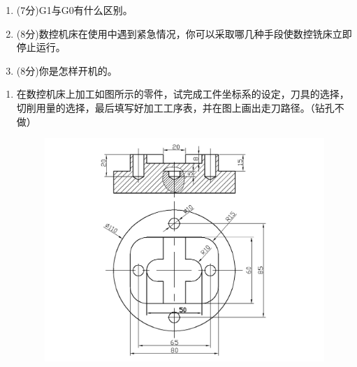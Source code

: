 \documentclass[12pt,twocolumn,landscape,UTF8,twoside]{ctexart}
\begin{document}
\begin{spacing}{1}
\begin{enumerate} [1.]
{	取中法对刀就是使用对刀或对刀工具接触工件上关于坐标轴对称的点，取得对称点的机床坐标，通过中点计算公式，计算出工件坐标系原点在机床坐标系中的坐标。 
	
	取中法对刀就是使用对刀或对刀工具接触工件上关于坐标轴对称的点，取得对称点的机床坐标，通过中点计算公式，计算出工件坐标系原点在机床坐标系中的坐标。 
	
}
\item (7分)G1与G0有什么区别。

\item (8分)数控机床在使用中遇到紧急情况，你可以采取哪几种手段使数控铣床立即停止运行。
\item (8分)你是怎样开机的。
\end{enumerate}
\newpage
\begin{enumerate} [1.]
\item 在数控机床上加工如图所示的零件，试完成工件坐标系的设定，刀具的选择，切削用量的选择，最后填写好加工工序表，并在图上画出走刀路径。（钻孔不做）
\begin{figure}[pht]
	\centering
	\includegraphics[width=0.5\linewidth]{figures/1.jpg}
	\label{fig:1}
\end{figure}
\end{enumerate}
\end{spacing}
\end{document}
